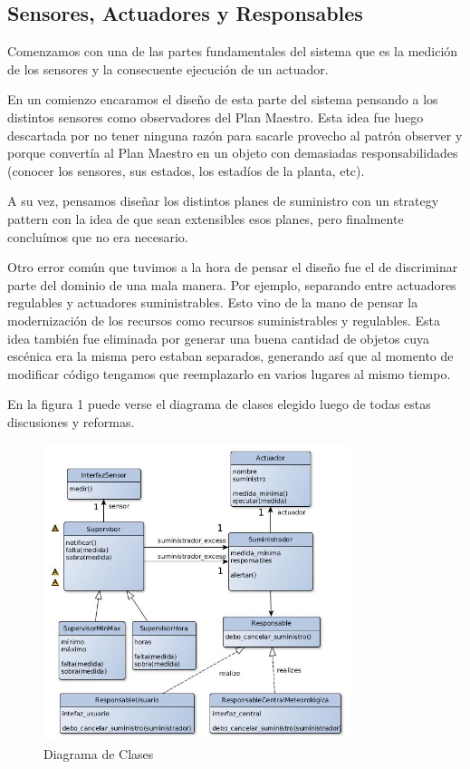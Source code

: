 \subsection{Sensores, Actuadores y Responsables}
Comenzamos con una de las partes fundamentales del sistema que es la medición de los sensores y la consecuente ejecución de un actuador. \newline

 
En un comienzo encaramos el diseño de esta parte del sistema pensando a los distintos sensores como observadores del Plan Maestro. Esta idea fue luego descartada por no tener ninguna razón para sacarle provecho al patrón observer y porque convertía al Plan Maestro en un objeto con demasiadas responsabilidades (conocer los sensores, sus estados, los estadíos de la planta, etc).

A su vez, pensamos diseñar los distintos planes de suministro con un strategy pattern con la idea de que sean extensibles esos planes, pero finalmente concluímos que no era necesario.\newline


 
Otro error común que tuvimos a la hora de pensar el diseño fue el de discriminar parte del dominio de una mala manera. Por ejemplo, separando entre actuadores regulables y actuadores suministrables. Esto vino de la mano de pensar la modernización de los recursos como recursos suministrables y regulables. Esta idea también fue eliminada por generar una buena cantidad de objetos cuya escénica era la misma pero estaban separados, generando así que al momento de modificar código tengamos que reemplazarlo en varios lugares al mismo tiempo.\newline

 
En la figura 1 puede verse el diagrama de clases elegido luego de todas estas discusiones y reformas.

\begin{figure}[h!]
  \centering
  \includegraphics[width=0.8\textwidth]{./imagenes/clases2.jpg}
  \caption{Diagrama de Clases}
  \label{fig:sec_sum1}
\end{figure}


